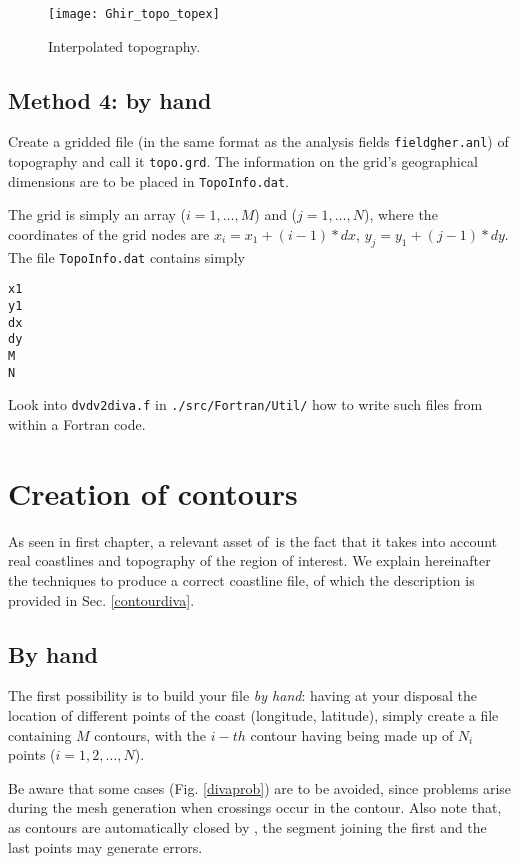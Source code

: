 \begin{figure}[htpb]
\centering
\texttt{[image: Ghir\_topo\_topex]}
\caption{Interpolated topography.\label{fig:guirtopodiva}}
\end{figure}


\subsection{Method 4: by hand}

Create a gridded file (in the same format as the analysis fields \texttt{fieldgher.anl}) of topography and call
it \texttt{topo.grd}. The information on the grid's geographical dimensions are to be placed in \texttt{TopoInfo.dat}.

The grid is simply an array ($i=1,\ldots,M$) and ($j=1,\ldots,N$), where the coordinates of the grid nodes are
$x_i=x_1+(i-1)*dx$, $y_j=y_1+(j-1)*dy$.  The file \texttt{TopoInfo.dat} contains simply
\begin{verbatim}
x1
y1
dx
dy
M
N
\end{verbatim}


Look into \texttt{dvdv2diva.f} in \texttt{./src/Fortran/Util/} how to write such files from within a Fortran code.


\section{Creation of contours\label{sec:contourgen}}

As seen in first chapter, a relevant asset of \diva\,is the fact that it takes into account real coastlines and topography of the region of interest. We explain hereinafter the techniques to produce a correct coastline file, of which the description is provided in Sec.  \ref{contourdiva}.


\subsection{By hand}

The first possibility is to build your file \textit{by hand}: having at your disposal the location of different points of the coast (longitude, latitude), simply create a file containing $M$ contours, with the $i-th$ contour having being made up of $N_{i}$ points ($i=1,2,\ldots, N$). 

Be aware that some cases (Fig. \ref{divaprob}) are to be avoided, since problems arise during the mesh generation when crossings occur in the contour. Also note that, as contours are automatically closed by \diva, the segment joining the first and the last points may generate errors. 


